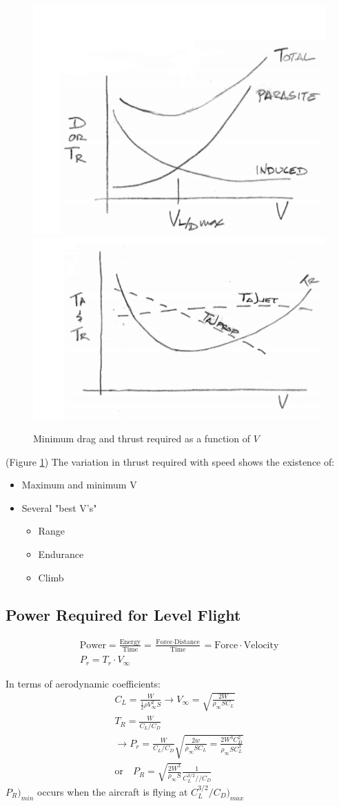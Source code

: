 \documentclass[draft=false, titlepage]{article}
\begin{document}
\begin{figure}[ht]
	\centering
	\includegraphics[width=0.4\linewidth]{Figures/p70_dragMin.PNG}
	\includegraphics[width=0.4\linewidth]{Figures/p70_dragMin2.PNG}
	\caption{Minimum drag and thrust required as a function of $V$}
	\label{fig:p70_dragMin}
\end{figure}
(Figure \ref{fig:p70_dragMin}) The variation in thrust required with speed shows the existence of:
\begin{itemize}
	\item Maximum and minimum V
	\item Several "best V's"
	\begin{itemize}
		\item Range
		\item Endurance
		\item Climb
	\end{itemize}
\end{itemize}

\subsection{Power Required for Level Flight}
\begin{gather*}
\text{Power} = \frac{\text{Energy}}{\text{Time}} = \frac{\text{Force}\cdot \text{Distance}}{\text{Time}} = \text{Force} \cdot \text{Velocity}\\P_r = T_r\cdot V_\infty
\end{gather*}

In terms of aerodynamic coefficients:
\begin{gather*}
C_L = \frac{W}{\frac{1}{2}\rho V_\infty^2 S} \rightarrow V_\infty = \sqrt{\frac{2W}{\rho_\infty SC_L}}\\
T_R = \frac{W}{C_L/C_D}\\
\rightarrow P_r = \frac{W}{C_L/C_D} \sqrt{\frac{2w}{\rho_\infty SC_L} = \frac{2W^3C_D^2}{\rho_\infty S C_L^3}}\\
\text{or}\quad P_R = \sqrt{\frac{2W^3}{\rho_\infty S}}\frac{1}{C_L^{3/2}//C_D}
\end{gather*}
$P_R\big)_{min}$ occurs when the aircraft is flying at $C_L^{3/2}/C_D\big)_{max}$
\end{document}
